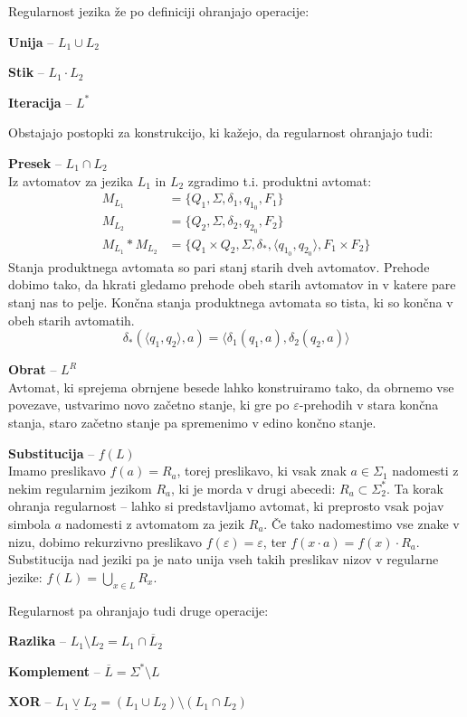 Regularnost jezika že po definiciji ohranjajo operacije:
\begin{items}
\item \textbf{Unija} -- $L_1 \cup L_2$ 
\item \textbf{Stik} -- $L_1 \cdot L_2$
\item \textbf{Iteracija} -- $L^*$
\end{items}
Obstajajo postopki za konstrukcijo, ki kažejo, da regularnost ohranjajo tudi:
\begin{items}
\item \textbf{Presek} -- $L_1 \cap L_2$\\
	Iz avtomatov za jezika $L_1$ in $L_2$ zgradimo t.i. produktni avtomat:
		\begin{align*}
			M_{L_1} &= \{ Q_1, \Sigma, \delta_1, q_{1_0}, F_1 \}\\
			M_{L_2} &= \{ Q_2, \Sigma, \delta_2, q_{2_0}, F_2 \}\\
			M_{L_1}*M_{L_2} &= \{ Q_1 \times Q_2, \Sigma, \delta_*, \langle q_{1_0}, q_{2_0} \rangle, F_1 \times F_2 \}
		\end{align*}
	Stanja produktnega avtomata so pari stanj starih dveh avtomatov. Prehode dobimo tako, da hkrati gledamo prehode obeh starih avtomatov in v katere pare stanj nas to pelje. Končna stanja produktnega avtomata so tista, ki so končna v obeh starih avtomatih.
	\[ \delta_*(\langle q_1, q_2 \rangle, a) = \langle \delta_1(q_1, a), \delta_2(q_2, a)\rangle \]
\item \textbf{Obrat} -- $L^R$\\
	Avtomat, ki sprejema obrnjene besede lahko konstruiramo tako, da obrnemo vse povezave, ustvarimo novo začetno stanje, ki gre po $\varepsilon$-prehodih v stara končna stanja, staro začetno stanje pa spremenimo v edino končno stanje.
\item \textbf{Substitucija} -- $f(L)$\\%
	Imamo preslikavo $f(a) = R_a$, torej preslikavo, ki vsak znak $a\in\Sigma_1$ nadomesti z nekim regularnim jezikom $R_a$, ki je morda v drugi abecedi: $R_a \subset \Sigma_2^*$. Ta korak ohranja regularnost -- lahko si predstavljamo avtomat, ki preprosto vsak pojav simbola $a$ nadomesti z avtomatom za jezik $R_a$. Če tako nadomestimo vse znake v nizu, dobimo rekurzivno preslikavo $f(\varepsilon)=\varepsilon$, ter $f(x\cdot a) = f(x)\cdot R_a$. Substitucija nad jeziki pa je nato unija vseh takih preslikav nizov v regularne jezike: $\displaystyle f(L)=\bigcup_{x\in L} R_x$.
\end{items}
Regularnost pa ohranjajo tudi druge operacije:
\begin{items}
\item \textbf{Razlika} -- $L_1 \setminus L_2 = L_1 \cap \overline L_2$
\item \textbf{Komplement} -- $\overline{L} = \Sigma^* \setminus L$
\item \textbf{XOR} -- $L_1 \underline\vee L_2 = (L_1 \cup L_2) \setminus (L_1 \cap L_2)$
\end{items}

